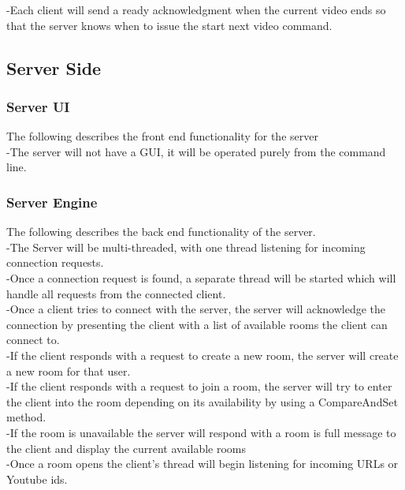 \documentclass{article}
\begin{document}
-Each client will send a ready acknowledgment when the current video ends so that the server knows when to issue the start next video command.

\subsection{Server Side}

\subsubsection{Server UI}
The following describes the front end functionality for the server\\

-The server will not have a GUI, it will be operated purely from the command line.

\subsubsection{Server Engine}
The following describes the back end functionality of the server.\\

-The Server will be multi-threaded, with one thread listening for incoming connection requests.\\

-Once a connection request is found, a separate thread will be started which will handle all requests from the connected client.\\

-Once a client tries to connect with the server, the server will acknowledge the connection by presenting the client with a list of available rooms the client can connect to.\\

-If the client responds with a request to create a new room, the server will create a new room for that user.\\

-If the client responds with a request to join a room, the server will try to enter the client into the room depending on its availability by using a CompareAndSet method.\\

-If the room is unavailable the server will respond with a room is full message to the client and display the current available rooms\\

-Once a room opens the client's thread will begin listening for incoming URLs or Youtube ids. \\
\end{document}
